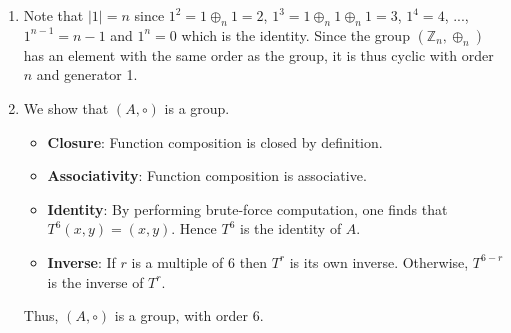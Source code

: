 \begin{enumerate}
    \item Note that $|1| = n$ since $1^2 = 1 \oplus_n 1 = 2$, $1^3 = 1 \oplus_n 1 \oplus_n 1 = 3$, $1^4 = 4$, ..., $1^{n-1} = n-1$ and $1^n = 0$ which is the identity. Since the group $(\mathbb{Z}_n, \oplus_n)$ has an element with the same order as the group, it is thus cyclic with order $n$ and generator 1.

    \item We show that $(A, \circ)$ is a group.
    \begin{itemize}
            \item \textbf{Closure}: Function composition is closed by definition.
            \item \textbf{Associativity}: Function composition is associative.
            \item \textbf{Identity}: By performing brute-force computation, one finds that $T^6(x, y) = (x, y)$. Hence $T^6$ is the identity of $A$.
            \item \textbf{Inverse}: If $r$ is a multiple of 6 then $T^r$ is its own inverse. Otherwise, $T^{6-r}$ is the inverse of $T^r$.
    \end{itemize}
    Thus, $(A, \circ)$ is a group, with order 6.
\end{enumerate}

